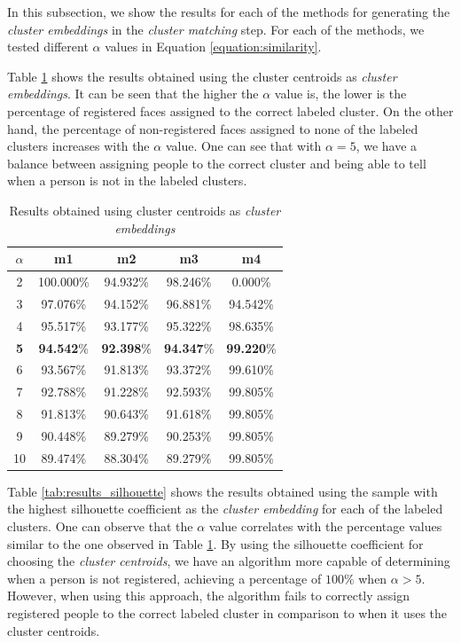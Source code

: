 In this subsection, we show the results for each of the methods for generating the \emph{cluster embeddings} in the \emph{cluster matching} step.
For each of the methods, we tested different $\alpha$ values in Equation \ref{equation:similarity}.

Table \ref{tab:results_centroid} shows the results obtained using the cluster centroids as \emph{cluster embeddings}.
It can be seen that the higher the $\alpha$ value is, the lower is the percentage of registered faces assigned to the correct labeled cluster.
On the other hand, the percentage of non-registered faces assigned to none of the labeled clusters increases with the $\alpha$ value.
One can see that with $\alpha = 5$, we have a balance between assigning people to the correct cluster and being able to tell when a person is not in the labeled clusters.

\begin{table}[!ht]
\centering
\small
\caption{Results obtained using cluster centroids as \emph{cluster embeddings}}
\label{tab:results_centroid}
\begin{tabular}{ccccc}
\hline
\textbf{$\alpha$} & \textbf{m1} & \textbf{m2} & \textbf{m3} & \textbf{m4} \\ \hline
2 & 100.000\% & 94.932\% & 98.246\% & 0.000\% \\
3 & 97.076\% & 94.152\% & 96.881\% & 94.542\% \\
4 & 95.517\% & 93.177\% & 95.322\% & 98.635\% \\
\textbf{5} & \textbf{94.542}\% & \textbf{92.398}\% & \textbf{94.347}\% & \textbf{99.220}\% \\
6 & 93.567\% & 91.813\% & 93.372\% & 99.610\% \\
7 & 92.788\% & 91.228\% & 92.593\% & 99.805\% \\
8 & 91.813\% & 90.643\% & 91.618\% & 99.805\% \\
9 & 90.448\% & 89.279\% & 90.253\% & 99.805\% \\
10 & 89.474\% & 88.304\% & 89.279\% & 99.805\%
\end{tabular}
\end{table}

Table \ref{tab:results_silhouette} shows the results obtained using the sample with the highest silhouette coefficient as the \emph{cluster embedding} for each of the labeled clusters.
One can observe that the $\alpha$ value correlates with the percentage values similar to the one observed in Table \ref{tab:results_centroid}.
By using the silhouette coefficient for choosing the \emph{cluster centroids}, we have an algorithm more capable of determining when a person is not registered, achieving a percentage of $100\%$ when $\alpha>5$.
However, when using this approach, the algorithm fails to correctly assign registered people to the correct labeled cluster in comparison to when it uses the cluster centroids.

